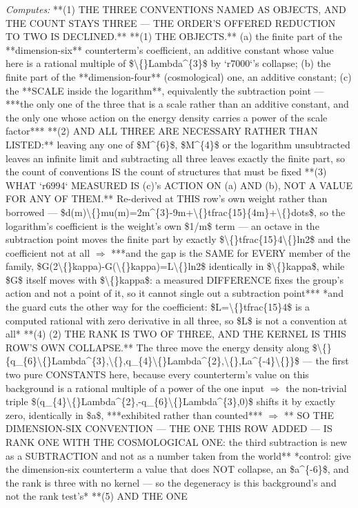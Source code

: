 \begin{description}
\emph{Computes:} **(1) THE THREE CONVENTIONS NAMED AS OBJECTS, AND THE COUNT STAYS THREE --- THE ORDER'S OFFERED REDUCTION TO TWO IS DECLINED.**  **(1) THE OBJECTS.** (a) the finite part of the **dimension-six** counterterm's coefficient, an additive constant whose value here is a rational multiple of \$\textbackslash\{\}Lambda\textasciicircum{}\{3\}\$ by `r7000`'s collapse; (b) the finite part of the **dimension-four** (cosmological) one, an additive constant; (c) the **SCALE inside the logarithm**, equivalently the subtraction point --- ***the only one of the three that is a scale rather than an additive constant, and the only one whose action on the energy density carries a power of the scale factor***  **(2) AND ALL THREE ARE NECESSARY RATHER THAN LISTED:** leaving any one of \$M\textasciicircum{}\{6\}\$, \$M\textasciicircum{}\{4\}\$ or the logarithm unsubtracted leaves an infinite limit and subtracting all three leaves exactly the finite part, so the count of conventions IS the count of structures that must be fixed  **(3)  WHAT `r6994` MEASURED IS (c)'s ACTION ON (a) AND (b), NOT A VALUE FOR ANY OF THEM.** Re-derived at THIS row's own weight rather than borrowed --- \$d(m)\textbackslash\{\}mu(m)=2m\textasciicircum{}\{3\}-9m+\textbackslash\{\}tfrac\{15\}\{4m\}+\textbackslash\{\}dots\$, so the logarithm's coefficient is the weight's own \$1/m\$ term --- an octave in the subtraction point moves the finite part by exactly \$\textbackslash\{\}tfrac\{15\}4\textbackslash\{\}ln2\$ and the coefficient not at all \ensuremath{\Rightarrow} ***and the gap is the SAME for EVERY member of the family, \$G(2\textbackslash\{\}kappa)-G(\textbackslash\{\}kappa)=L\textbackslash\{\}ln2\$ identically in \$\textbackslash\{\}kappa\$, while \$G\$ itself moves with \$\textbackslash\{\}kappa\$: a measured DIFFERENCE fixes the group's action and not a point of it, so it cannot single out a subtraction point***  *and the guard cuts the other way for the coefficient: \$L=\textbackslash\{\}tfrac\{15\}4\$ is a computed rational with zero derivative in all three, so \$L\$ is not a convention at all*  **(4)  (2) THE RANK IS TWO OF THREE, AND THE KERNEL IS THIS ROW'S OWN COLLAPSE.** The three move the energy density along \$\textbackslash\{\}\{q\_\{6\}\textbackslash\{\}Lambda\textasciicircum{}\{3\},\textbackslash\{\},q\_\{4\}\textbackslash\{\}Lambda\textasciicircum{}\{2\},\textbackslash\{\},La\textasciicircum{}\{-4\}\textbackslash\{\}\}\$ --- the first two pure CONSTANTS here, because every counterterm's value on this background is a rational multiple of a power of the one input \ensuremath{\Rightarrow} the non-trivial triple \$(q\_\{4\}\textbackslash\{\}Lambda\textasciicircum{}\{2\},-q\_\{6\}\textbackslash\{\}Lambda\textasciicircum{}\{3\},0)\$ shifts it by exactly zero, identically in \$a\$, ***exhibited rather than counted*** \ensuremath{\Rightarrow} ** SO THE DIMENSION-SIX CONVENTION --- THE ONE THIS ROW ADDED --- IS RANK ONE WITH THE COSMOLOGICAL ONE: the third subtraction is new as a SUBTRACTION and not as a number taken from the world**  *control: give the dimension-six counterterm a value that does NOT collapse, an \$a\textasciicircum{}\{-6\}\$, and the rank is three with no kernel --- so the degeneracy is this background's and not the rank test's*  **(5)  AND THE ONE 
\end{description}
